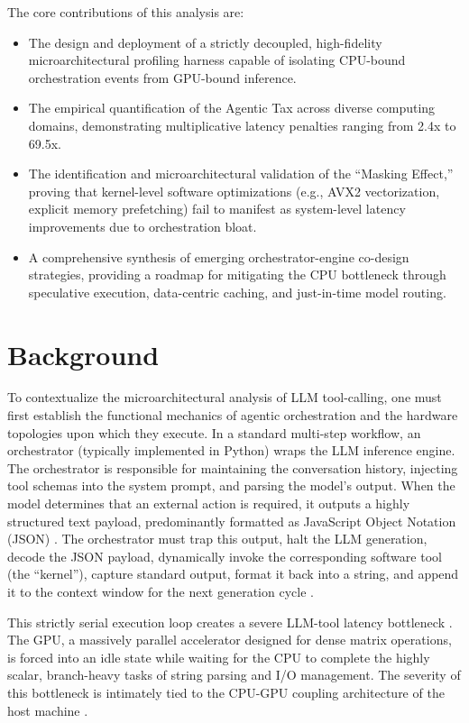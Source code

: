 \documentclass[10pt, letterpaper]{article}
\begin{document}
The core contributions of this analysis are:
\begin{itemize}
    \item The design and deployment of a strictly decoupled, high-fidelity microarchitectural profiling harness capable of isolating CPU-bound orchestration events from GPU-bound inference.
    \item The empirical quantification of the Agentic Tax across diverse computing domains, demonstrating multiplicative latency penalties ranging from 2.4x to 69.5x.
    \item The identification and microarchitectural validation of the ``Masking Effect,'' proving that kernel-level software optimizations (e.g., AVX2 vectorization, explicit memory prefetching) fail to manifest as system-level latency improvements due to orchestration bloat.
    \item A comprehensive synthesis of emerging orchestrator-engine co-design strategies, providing a roadmap for mitigating the CPU bottleneck through speculative execution, data-centric caching, and just-in-time model routing.
\end{itemize}

\section{Background}
To contextualize the microarchitectural analysis of LLM tool-calling, one must first establish the functional mechanics of agentic orchestration and the hardware topologies upon which they execute. In a standard multi-step workflow, an orchestrator (typically implemented in Python) wraps the LLM inference engine. The orchestrator is responsible for maintaining the conversation history, injecting tool schemas into the system prompt, and parsing the model's output. When the model determines that an external action is required, it outputs a highly structured text payload, predominantly formatted as JavaScript Object Notation (JSON) \cite{simdjson}. The orchestrator must trap this output, halt the LLM generation, decode the JSON payload, dynamically invoke the corresponding software tool (the ``kernel''), capture standard output, format it back into a string, and append it to the context window for the next generation cycle \cite{paste}.

This strictly serial execution loop creates a severe LLM-tool latency bottleneck \cite{paste}. The GPU, a massively parallel accelerator designed for dense matrix operations, is forced into an idle state while waiting for the CPU to complete the highly scalar, branch-heavy tasks of string parsing and I/O management. The severity of this bottleneck is intimately tied to the CPU-GPU coupling architecture of the host machine \cite{coupled_architectures}. 
\end{document}
